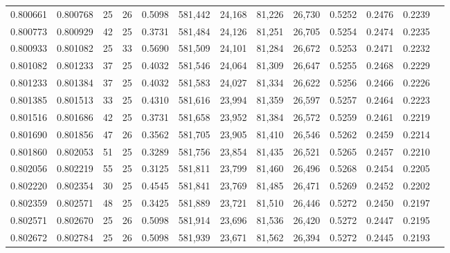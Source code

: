 \begin{tabular}{rrrrrrrrrrrrr}
0.800661 & 0.800768 &    25 &  26 &                                     0.5098 & 581,442 &  24,168 &  81,226 &  26,730 & 0.5252 & 0.2476 & 0.2239 \\
0.800773 & 0.800929 &    42 &  25 &                                     0.3731 & 581,484 &  24,126 &  81,251 &  26,705 & 0.5254 & 0.2474 & 0.2235 \\
0.800933 & 0.801082 &    25 &  33 &                                     0.5690 & 581,509 &  24,101 &  81,284 &  26,672 & 0.5253 & 0.2471 & 0.2232 \\
0.801082 & 0.801233 &    37 &  25 &                                     0.4032 & 581,546 &  24,064 &  81,309 &  26,647 & 0.5255 & 0.2468 & 0.2229 \\
0.801233 & 0.801384 &    37 &  25 &                                     0.4032 & 581,583 &  24,027 &  81,334 &  26,622 & 0.5256 & 0.2466 & 0.2226 \\
0.801385 & 0.801513 &    33 &  25 &                                     0.4310 & 581,616 &  23,994 &  81,359 &  26,597 & 0.5257 & 0.2464 & 0.2223 \\
0.801516 & 0.801686 &    42 &  25 &                                     0.3731 & 581,658 &  23,952 &  81,384 &  26,572 & 0.5259 & 0.2461 & 0.2219 \\
0.801690 & 0.801856 &    47 &  26 &                                     0.3562 & 581,705 &  23,905 &  81,410 &  26,546 & 0.5262 & 0.2459 & 0.2214 \\
0.801860 & 0.802053 &    51 &  25 &                                     0.3289 & 581,756 &  23,854 &  81,435 &  26,521 & 0.5265 & 0.2457 & 0.2210 \\
0.802056 & 0.802219 &    55 &  25 &                                     0.3125 & 581,811 &  23,799 &  81,460 &  26,496 & 0.5268 & 0.2454 & 0.2205 \\
0.802220 & 0.802354 &    30 &  25 &                                     0.4545 & 581,841 &  23,769 &  81,485 &  26,471 & 0.5269 & 0.2452 & 0.2202 \\
0.802359 & 0.802571 &    48 &  25 &                                     0.3425 & 581,889 &  23,721 &  81,510 &  26,446 & 0.5272 & 0.2450 & 0.2197 \\
0.802571 & 0.802670 &    25 &  26 &                                     0.5098 & 581,914 &  23,696 &  81,536 &  26,420 & 0.5272 & 0.2447 & 0.2195 \\
0.802672 & 0.802784 &    25 &  26 &                                     0.5098 & 581,939 &  23,671 &  81,562 &  26,394 & 0.5272 & 0.2445 & 0.2193 \\

\end{tabular}
